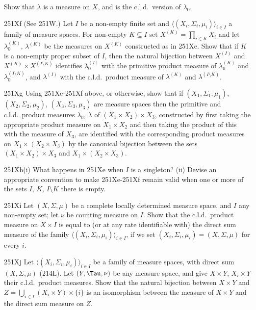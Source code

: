 {\noindent Show that $\lambda$ is a measure on $X$, and is the c.l.d.\
version of $\lambda_0$.

\sqheader 251Xf (See 251W.)  Let $I$ be a non-empty finite set and
$\langle(X_i,\Sigma_i,\mu_i)\rangle_{i\in I}$ a family of measure
spaces.   For non-empty $K\subseteq I$ set $X^{(K)}=\prod_{i\in K}X_i$
and let $\lambda_0^{(K)}$, $\lambda^{(K)}$ be the measures on $X^{(K)}$
constructed as in 251Xe.   Show that if $K$ is a non-empty proper
subset of $I$, then the natural bijection between $X^{(I)}$ and
$X^{(K)}\times X^{(I\setminus K)}$ identifies $\lambda_0^{(I)}$ with the
primitive product measure of $\lambda_0^{(K)}$ and
$\lambda_0^{(I\setminus K)}$, and $\lambda^{(I)}$ with the c.l.d.\
product measure of $\lambda^{(K)}$ and $\lambda^{(I\setminus K)}$.

\sqheader 251Xg Using 251Xe-251Xf above, or otherwise, show that if
$(X_1,\Sigma_1,\mu_1)$, $(X_2,\Sigma_2,\mu_2)$,
$(X_3,\Sigma_3,\mu_3)$ are measure spaces then the primitive and c.l.d.\
product measures
$\lambda_0$, $\lambda$ of $(X_1\times X_2)\times X_3$, constructed by
first taking the appropriate product measure on $X_1\times X_2$ and then
taking the product of this with the measure of $X_3$, are identified
with the corresponding product measures on $X_1\times(X_2\times X_3)$ by
the canonical bijection between the sets $(X_1\times X_2)\times X_3$ and
$X_1\times(X_2\times X_3)$.

\spheader 251Xh(i) What happens in 251Xe when $I$ is a
singleton?  (ii) Devise an appropriate convention to make 251Xe-251Xf
remain valid when one or more of the sets $I$, $K$, $I\setminus K$ there
is empty.

\sqheader 251Xi Let $(X,\Sigma,\mu)$ be a complete locally
determined measure space, and $I$ any non-empty set;  let $\nu$ be
counting measure on $I$.   Show that the c.l.d.\ product measure on
$X\times I$ is equal to (or at any rate identifiable with) the direct
sum measure of the family $\langle(X_i,\Sigma_i,\mu_i)\rangle_{i\in I}$,
if we set $(X_i,\Sigma_i,\mu_i)=(X,\Sigma,\mu)$ for every $i$.

\sqheader 251Xj Let
$\langle(X_i,\Sigma_i,\mu_i)\rangle_{i\in I}$ be a family of measure
spaces, with direct sum $(X,\Sigma,\mu)$
(214L).   Let $(Y,\Tau,\nu)$ be any measure space, and give $X\times Y$,
$X_i\times Y$ their c.l.d.\ product measures.   Show that the natural
bijection between $X\times Y$ and
$Z=\bigcup_{i\in I}(X_i\times Y)\times\{i\}$
is an isomorphism between the measure of $X\times Y$ and
the direct sum measure on $Z$.

}
